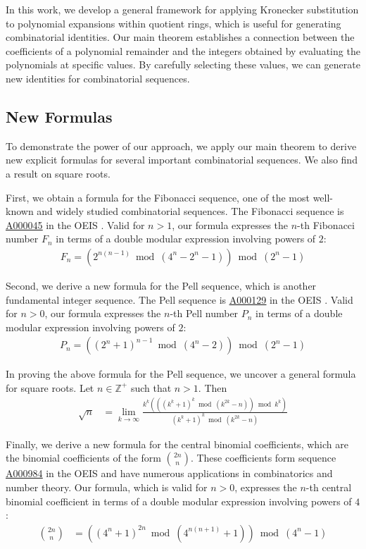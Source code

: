 \documentclass[11pt,reqno]{article}
\theoremstyle{plain}
\theoremstyle{definition}
\newcommand{\seqnum}[1]{\href{https://oeis.org/#1}{\rm \underline{#1}}}
\begin{document}
In this work, we develop a general framework for applying Kronecker substitution to polynomial expansions within quotient rings, which is useful for generating combinatorial identities. Our main theorem establishes a connection between the coefficients of a polynomial remainder and the integers obtained by evaluating the polynomials at specific values. By carefully selecting these values, we can generate new identities for combinatorial sequences.

\subsection{New Formulas}
To demonstrate the power of our approach, we apply our main theorem to derive new explicit formulas for several important combinatorial sequences. We also find a result on square roots.

First, we obtain a formula for the Fibonacci sequence, one of the most well-known and widely studied combinatorial sequences. The Fibonacci sequence is \seqnum{A000045} in the OEIS \cite{A000045}. Valid for $n > 1$, our formula expresses the $n$-th Fibonacci number $F_n$ in terms of a double modular expression involving powers of $2$:
\begin{align*}
    F_n = (2^{n(n-1)} \bmod{(4^n-2^n-1)}) \bmod{(2^n-1)}
\end{align*}

Second, we derive a new formula for the Pell sequence, which is another fundamental integer sequence. The Pell sequence is \seqnum{A000129} in the OEIS \cite{A000129}. Valid for $n > 0$, our formula expresses the $n$-th Pell number $P_n$ in terms of a double modular expression involving powers of $2$:
\begin{align*}
    P_n = ((2^{n}+1)^{n-1} \bmod{(4^n-2)}) \bmod{(2^n-1)}
\end{align*}

In proving the above formula for the Pell sequence, we uncover a general formula for square roots. Let $n \in \mathbb{Z}^+$ such that $n > 1$. Then
\begin{align*}
\sqrt{n} &= \lim_{k\rightarrow\infty}
    \frac{k^k (((k^k + 1)^k \bmod{(k^{2k}-n)}) \bmod{k^k})}
        {(k^k + 1)^k \bmod{(k^{2k}-n)}}
\end{align*}

Finally, we derive a new formula for the central binomial coefficients, which are the binomial coefficients of the form $\binom{2n}{n}$. These coefficients form sequence \seqnum{A000984} in the OEIS \cite{A000984} and have numerous applications in combinatorics and number theory. Our formula, which is valid for $n > 0$, expresses the $n$-th central binomial coefficient in terms of a double modular expression involving powers of $4$:
\begin{align*}
    \binom{2n}{n} &= ((4^n + 1)^{2n} \bmod{(4^{n(n+1)} + 1)}) \bmod{(4^n-1)}
\end{align*}
\end{document}

